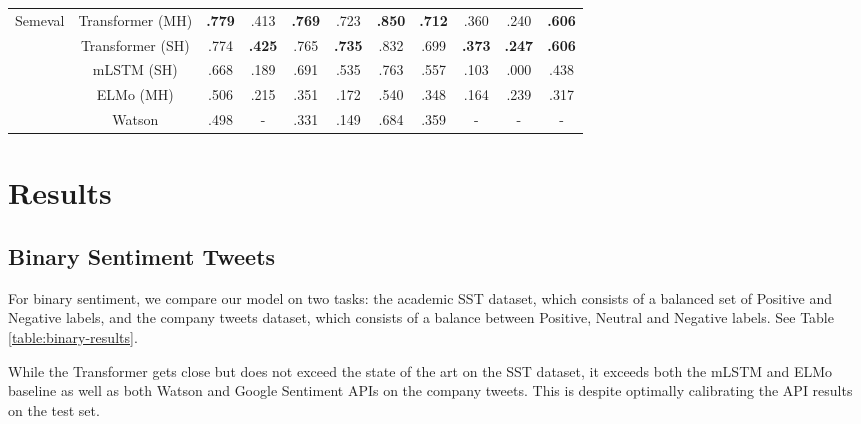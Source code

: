 \documentclass[letterpaper]{article} %
\begin{document}
\begin{table}[!htpb]
{{\begin{tabular}{cccccccccc|c}
\midrule
\multirow{3}{*}{Semeval} & Transformer (MH) & \textbf{.779} & .413 & \textbf{.769} & .723 & \textbf{.850} & \textbf{.712} & .360 & .240 & \textbf{.606} \\
& Transformer (SH) & .774 & \textbf{.425} & .765 & \textbf{.735} & .832 & .699 & \textbf{.373} & \textbf{.247} & \textbf{.606} \\
& mLSTM (SH) & .668 & .189 & .691 & .535 & .763 & .557 & .103 & .000 & .438 \\
& ELMo (MH) & .506 & .215 & .351 & .172 & .540 & .348 & .164 & .239 & .317 \\
& Watson & .498  & - & .331 & .149 & .684 & .359 & - & - & - \\
\bottomrule
\end{tabular}
}
}
\end{table}

\section{Results}
\subsection{Binary Sentiment Tweets}
For binary sentiment, we compare our model on two tasks: the academic SST dataset, which consists of a balanced set of Positive and Negative labels, and the company tweets dataset, which consists of a balance between Positive, Neutral and Negative labels. See Table \ref{table:binary-results}.

While the Transformer gets close but does not exceed the state of the art on the SST dataset, it exceeds both the mLSTM and ELMo baseline as well as both Watson and Google Sentiment APIs on the company tweets. This is despite optimally calibrating the API results on the test set.
\end{document}
